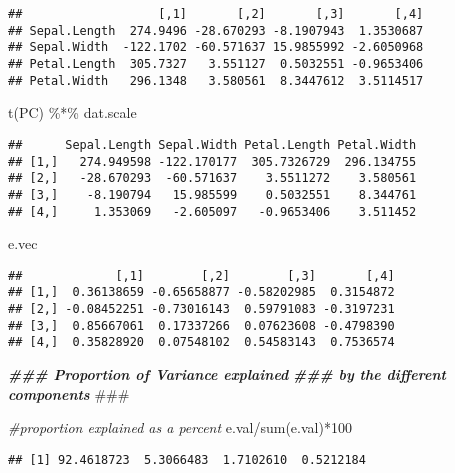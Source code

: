 \documentclass[
]{book}
\newenvironment{Shaded}{\begin{snugshade}}{\end{snugshade}}
\newcommand{\AlertTok}[1]{\textcolor[rgb]{0.94,0.16,0.16}{#1}}
\newcommand{\CommentTok}[1]{\textcolor[rgb]{0.56,0.35,0.01}{\textit{#1}}}
\newcommand{\DecValTok}[1]{\textcolor[rgb]{0.00,0.00,0.81}{#1}}
\newcommand{\DocumentationTok}[1]{\textcolor[rgb]{0.56,0.35,0.01}{\textbf{\textit{#1}}}}
\newcommand{\FunctionTok}[1]{\textcolor[rgb]{0.00,0.00,0.00}{#1}}
\newcommand{\NormalTok}[1]{#1}
\newcommand{\SpecialCharTok}[1]{\textcolor[rgb]{0.00,0.00,0.00}{#1}}
\begin{document}
\begin{verbatim}
##                   [,1]       [,2]       [,3]       [,4]
## Sepal.Length  274.9496 -28.670293 -8.1907943  1.3530687
## Sepal.Width  -122.1702 -60.571637 15.9855992 -2.6050968
## Petal.Length  305.7327   3.551127  0.5032551 -0.9653406
## Petal.Width   296.1348   3.580561  8.3447612  3.5114517
\end{verbatim}

\begin{Shaded}
\begin{Highlighting}[]
\FunctionTok{t}\NormalTok{(PC) }\SpecialCharTok{\%*\%}\NormalTok{ dat.scale}
\end{Highlighting}
\end{Shaded}

\begin{verbatim}
##      Sepal.Length Sepal.Width Petal.Length Petal.Width
## [1,]   274.949598 -122.170177  305.7326729  296.134755
## [2,]   -28.670293  -60.571637    3.5511272    3.580561
## [3,]    -8.190794   15.985599    0.5032551    8.344761
## [4,]     1.353069   -2.605097   -0.9653406    3.511452
\end{verbatim}

\begin{Shaded}
\begin{Highlighting}[]
\NormalTok{e.vec}
\end{Highlighting}
\end{Shaded}

\begin{verbatim}
##             [,1]        [,2]        [,3]       [,4]
## [1,]  0.36138659 -0.65658877 -0.58202985  0.3154872
## [2,] -0.08452251 -0.73016143  0.59791083 -0.3197231
## [3,]  0.85667061  0.17337266  0.07623608 -0.4798390
## [4,]  0.35828920  0.07548102  0.54583143  0.7536574
\end{verbatim}

\begin{Shaded}
\begin{Highlighting}[]
\DocumentationTok{\#\#\# Proportion of Variance explained }
\DocumentationTok{\#\#\# by the different components }\AlertTok{\#\#\#}

\CommentTok{\#proportion explained as a percent}
\NormalTok{e.val}\SpecialCharTok{/}\FunctionTok{sum}\NormalTok{(e.val)}\SpecialCharTok{*}\DecValTok{100}
\end{Highlighting}
\end{Shaded}

\begin{verbatim}
## [1] 92.4618723  5.3066483  1.7102610  0.5212184
\end{verbatim}
\end{document}
